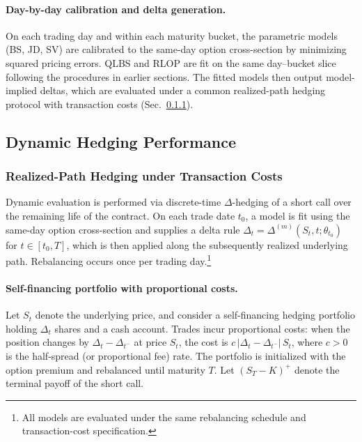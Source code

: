 \paragraph{Day-by-day calibration and delta generation.}
On each trading day and within each maturity bucket, the parametric models (BS, JD, SV) are calibrated to the same-day option cross-section by minimizing squared
pricing errors.
QLBS and RLOP are fit on the same day--bucket slice following the procedures in earlier sections.
The fitted models then output model-implied deltas, which are evaluated under a common realized-path hedging protocol with transaction costs (Sec.~\ref{subsubsec:realized_path_hedging}).


\subsection{Dynamic Hedging Performance}
\label{subsec:dynamic_hedging}

\subsubsection{Realized-Path Hedging under Transaction Costs}
\label{subsubsec:realized_path_hedging}

Dynamic evaluation is performed via discrete-time $\Delta$-hedging of a short call over the remaining life of the contract.
On each trade date $t_0$, a model is fit using the same-day option cross-section and supplies a delta rule
$\Delta_t=\Delta^{(m)}(S_t,t; \theta_{t_0})$ for $t\in[t_0,T]$, which is then applied along the subsequently realized underlying path.
Rebalancing occurs once per trading day.\footnote{All models are evaluated under the same rebalancing schedule and transaction-cost specification.}

\paragraph{Self-financing portfolio with proportional costs.}
Let $S_t$ denote the underlying price, and consider a self-financing hedging portfolio holding $\Delta_t$ shares and a cash account.
Trades incur proportional costs: when the position changes by $\Delta_t-\Delta_{t^-}$ at price $S_t$, the cost is
$c\,|\Delta_t-\Delta_{t^-}|\,S_t$, where $c>0$ is the half-spread (or proportional fee) rate.
The portfolio is initialized with the option premium and rebalanced until maturity $T$.
Let $(S_T-K)^+$ denote the terminal payoff of the short call.

